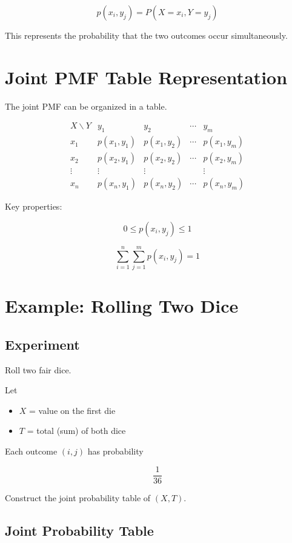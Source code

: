 \documentclass[11pt]{article}
\begin{document}
\[
p(x_i,y_j) = P(X=x_i, Y=y_j)
\]

This represents the probability that the two outcomes occur simultaneously.

\section{Joint PMF Table Representation}

The joint PMF can be organized in a table.

\[
\begin{array}{c|cccc}
X\backslash Y & y_1 & y_2 & \cdots & y_m \\ \hline
x_1 & p(x_1,y_1) & p(x_1,y_2) & \cdots & p(x_1,y_m) \\
x_2 & p(x_2,y_1) & p(x_2,y_2) & \cdots & p(x_2,y_m) \\
\vdots & \vdots & \vdots & & \vdots \\
x_n & p(x_n,y_1) & p(x_n,y_2) & \cdots & p(x_n,y_m)
\end{array}
\]

Key properties:

\[
0 \le p(x_i,y_j) \le 1
\]

\[
\sum_{i=1}^{n}\sum_{j=1}^{m} p(x_i,y_j) = 1
\]

\section{Example: Rolling Two Dice}

\subsection*{Experiment}

Roll two fair dice.

Let
\begin{itemize}[noitemsep]
\item $X$ = value on the first die
\item $T$ = total (sum) of both dice
\end{itemize}

Each outcome $(i,j)$ has probability

\[
\frac{1}{36}
\]

Construct the joint probability table of $(X,T)$.

\subsection*{Joint Probability Table}
\end{document}
